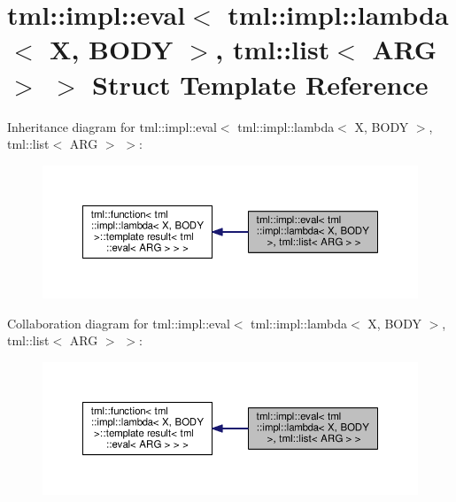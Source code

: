 \hypertarget{structtml_1_1impl_1_1eval_3_01tml_1_1impl_1_1lambda_3_01_x_00_01_b_o_d_y_01_4_00_01tml_1_1list_3_01_a_r_g_01_4_01_4}{\section{tml\+:\+:impl\+:\+:eval$<$ tml\+:\+:impl\+:\+:lambda$<$ X, B\+O\+D\+Y $>$, tml\+:\+:list$<$ A\+R\+G $>$ $>$ Struct Template Reference}
\label{structtml_1_1impl_1_1eval_3_01tml_1_1impl_1_1lambda_3_01_x_00_01_b_o_d_y_01_4_00_01tml_1_1list_3_01_a_r_g_01_4_01_4}
}


Inheritance diagram for tml\+:\+:impl\+:\+:eval$<$ tml\+:\+:impl\+:\+:lambda$<$ X, B\+O\+D\+Y $>$, tml\+:\+:list$<$ A\+R\+G $>$ $>$\+:
\nopagebreak
\begin{figure}[H]
\begin{center}
\leavevmode
\includegraphics[width=350pt]{structtml_1_1impl_1_1eval_3_01tml_1_1impl_1_1lambda_3_01_x_00_01_b_o_d_y_01_4_00_01tml_1_1list_3f2036f4018f170023e23b07f7c0f11f5}
\end{center}
\end{figure}


Collaboration diagram for tml\+:\+:impl\+:\+:eval$<$ tml\+:\+:impl\+:\+:lambda$<$ X, B\+O\+D\+Y $>$, tml\+:\+:list$<$ A\+R\+G $>$ $>$\+:
\nopagebreak
\begin{figure}[H]
\begin{center}
\leavevmode
\includegraphics[width=350pt]{structtml_1_1impl_1_1eval_3_01tml_1_1impl_1_1lambda_3_01_x_00_01_b_o_d_y_01_4_00_01tml_1_1list_336671822ce1ba3663b9bd047a9513a78}
\end{center}
\end{figure}
